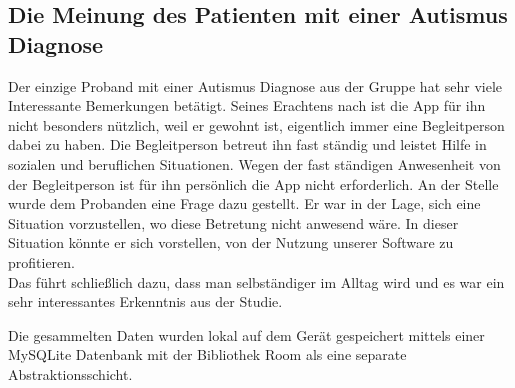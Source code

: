 \subsection{Die Meinung des Patienten mit einer Autismus Diagnose}
Der einzige Proband mit einer Autismus Diagnose aus der Gruppe hat sehr viele Interessante Bemerkungen betätigt. Seines Erachtens nach ist die App für ihn nicht besonders nützlich, weil er gewohnt ist, eigentlich immer eine Begleitperson dabei zu haben. Die Begleitperson betreut ihn fast ständig und leistet Hilfe in sozialen und beruflichen Situationen. Wegen der fast ständigen Anwesenheit von der Begleitperson ist für ihn persönlich die App nicht erforderlich. An der Stelle wurde dem Probanden eine Frage dazu gestellt. Er war in der Lage, sich eine Situation vorzustellen, wo diese Betretung nicht anwesend wäre. In dieser Situation könnte er sich vorstellen, von der Nutzung unserer Software zu profitieren.\\
Das führt schließlich dazu, dass man selbständiger im Alltag wird und es war ein sehr interessantes Erkenntnis aus der Studie.



Die gesammelten Daten wurden lokal auf dem Gerät gespeichert mittels einer MySQLite Datenbank mit der Bibliothek Room als eine separate Abstraktionsschicht.